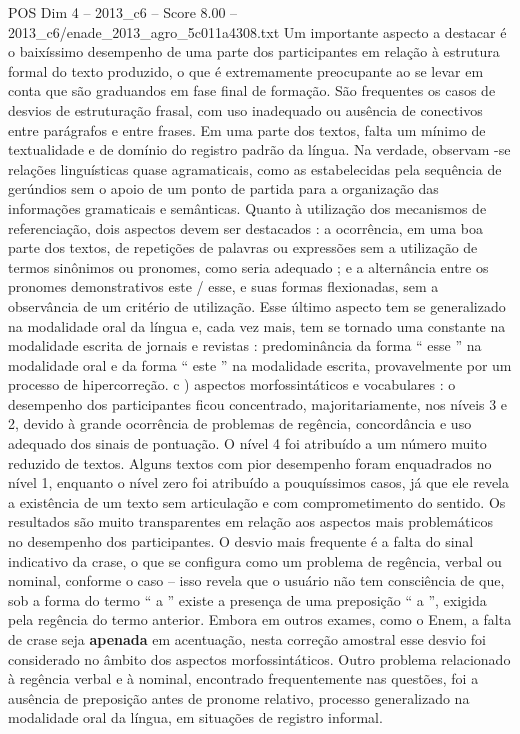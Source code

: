 \begin{textsample}{POS Dim 4 – 2013\_c6 – Score 8.00 – 2013\_c6/enade\_2013\_agro\_5c011a4308.txt}
Um importante aspecto a destacar é o baixíssimo desempenho de uma parte dos participantes em relação à estrutura formal do texto produzido, o que é extremamente preocupante ao se levar em conta que são graduandos em fase final de formação.
São frequentes os casos de desvios de estruturação frasal, com uso inadequado ou ausência de conectivos entre parágrafos e entre frases.
Em uma parte dos textos, falta um mínimo de textualidade e de domínio do registro padrão da língua.
Na verdade, observam -se relações linguísticas quase agramaticais, como as estabelecidas pela sequência de gerúndios sem o apoio de um ponto de partida para a organização das informações gramaticais e semânticas.
Quanto à utilização dos mecanismos de referenciação, dois aspectos devem ser destacados : a ocorrência, em uma boa parte dos textos, de repetições de palavras ou expressões sem a utilização de termos sinônimos ou pronomes, como seria adequado ; e a alternância entre os pronomes demonstrativos este / esse, e suas formas flexionadas, sem a observância de um critério de utilização.
Esse último aspecto tem se generalizado na modalidade oral da língua e, cada vez mais, tem se tornado uma constante na modalidade escrita de jornais e revistas : predominância da forma “ esse ” na modalidade oral e da forma “ este ” na modalidade escrita, provavelmente por um processo de hipercorreção. c ) aspectos morfossintáticos e vocabulares : o desempenho dos participantes ficou concentrado, majoritariamente, nos níveis 3 e 2, devido à grande ocorrência de problemas de regência, concordância e uso adequado dos sinais de pontuação.
O nível 4 foi atribuído a um número muito reduzido de textos.
Alguns textos com pior desempenho foram enquadrados no nível 1, enquanto o nível zero foi atribuído a pouquíssimos casos, já que ele revela a existência de um texto sem articulação e com comprometimento do sentido.
Os resultados são muito transparentes em relação aos aspectos mais problemáticos no desempenho dos participantes.
O desvio mais frequente é a falta do sinal indicativo da crase, o que se configura como um problema de regência, verbal ou nominal, conforme o caso – isso revela que o usuário não tem consciência de que, sob a forma do termo “ a ” existe a presença de uma preposição “ a ”, exigida pela regência do termo anterior.
Embora em outros exames, como o Enem, a falta de crase seja \textbf{apenada} em acentuação, nesta correção amostral esse desvio foi considerado no âmbito dos aspectos morfossintáticos.
Outro problema relacionado à regência verbal e à nominal, encontrado frequentemente nas questões, foi a ausência de preposição antes de pronome relativo, processo generalizado na modalidade oral da língua, em situações de registro informal.

\end{textsample}
